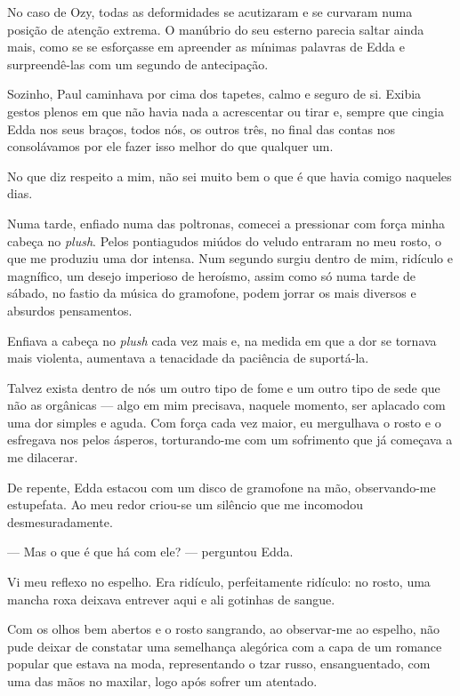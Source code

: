 No caso de Ozy, todas as deformidades se acutizaram e se curvaram numa posição
de atenção extrema. O manúbrio do seu esterno parecia saltar ainda mais, como
se se esforçasse em apreender as mínimas palavras de Edda e surpreendê-las
com um segundo de antecipação.

Sozinho, Paul caminhava por cima dos tapetes, calmo e seguro de si. Exibia
gestos plenos em que não havia nada a acrescentar ou tirar e, sempre que
cingia Edda nos seus braços, todos nós, os outros três, no final das contas
nos consolávamos por ele fazer isso melhor do que qualquer um.

No que diz respeito a mim, não sei muito bem o que é que havia comigo naqueles
dias.

Numa tarde, enfiado numa das poltronas, comecei a pressionar com força minha
cabeça no \textit{plush}. Pelos pontiagudos miúdos do veludo entraram no meu
rosto, o que me produziu uma dor intensa. Num segundo surgiu dentro de mim,
ridículo e magnífico, um desejo imperioso de heroísmo, assim como só numa
tarde de sábado, no fastio da música do gramofone, podem jorrar os mais
diversos e absurdos pensamentos.

Enfiava a cabeça no \textit{plush} cada vez mais e, na medida em que a dor se
tornava mais violenta, aumentava a tenacidade da paciência de suportá-la.

Talvez exista dentro de nós um outro tipo de fome e um outro tipo de sede que
não as orgânicas --- algo em mim precisava, naquele momento, ser aplacado com
uma dor simples e aguda. Com força cada vez maior, eu mergulhava o rosto e o
esfregava nos pelos ásperos, torturando-me com um sofrimento que já começava
a me dilacerar.

De repente, Edda estacou com um disco de gramofone na mão, observando-me
estupefata. Ao meu redor criou-se um silêncio que me incomodou
desmesuradamente. 

--- Mas o que é que há com ele? --- perguntou Edda. 

Vi meu reflexo no espelho. Era ridículo, perfeitamente ridículo: no rosto, uma
mancha roxa deixava entrever aqui e ali gotinhas de sangue.

Com os olhos bem abertos e o rosto sangrando, ao observar-me ao espelho, não
pude deixar de constatar uma semelhança alegórica com a capa de um romance
popular que estava na moda, representando o tzar russo, ensanguentado, com
uma das mãos no maxilar, logo após sofrer um atentado.


